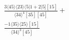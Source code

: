 \documentclass[varwidth, border=5pt]{standalone}
\begin{document}
\begin{my}
$\begin{gathered}
\scriptscriptstyle\frac{3⟨45⟩⟨23⟩⟨5|1+2|5][15]}{⟨34⟩^4[35][45]}+\\
\scriptscriptstyle\frac{-1⟨35⟩⟨25⟩[15]}{⟨34⟩^3[45]}\phantom{+}
\end{gathered}$
\end{my}
\end{document}
